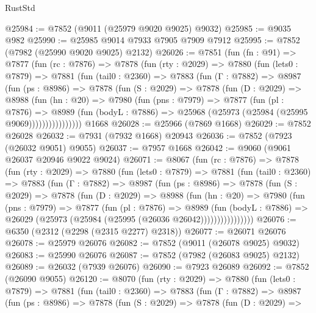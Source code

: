 \begin{lexlean}{RustStd}
\begin{coremodule}
@25984 := @7852 (@9011 (@25979 @9020 @9025) @9032)
@25985 := @9035 @982
@25990 := @25985 @9014 @7933 @7905 @7909 @7912
@25995 := @7852 (@7982 (@25990 @9020 @9025) @2132)
@26026 := @7851
    (fun (fn : @91) =>
    @7877
      (fun (rc : @7876) =>
      @7878
        (fun (rty : @2029) =>
        @7880
          (fun (lets0 : @7879) =>
          @7881
            (fun (tail0 : @2360) =>
            @7883
              (fun (Γ : @7882) =>
              @8987
                (fun (ps : @8986) =>
                @7878
                  (fun (S : @2029) =>
                  @7878
                    (fun (D : @2029) =>
                    @8988
                      (fun (hn : @20) =>
                      @7980
                        (fun (pns : @7979) =>
                        @7877
                          (fun (pl : @7876) =>
                          @8989
                            (fun (bodyL : @7886) =>
                            @25968 (@25973 (@25984 (@25995 @9069))))))))))))))))
    @1668
@26028 := @25966 (@7869 @1668)
@26029 := @7852 @26028
@26032 := @7931 (@7932 @1668) @20943
@26036 := @7852 (@7923 (@26032 @9051) @9055)
@26037 := @7957 @1668
@26042 := @9060 (@9061 @26037 @20946 @9022 @9024)
@26071 := @8067
    (fun (rc : @7876) =>
    @7878
      (fun (rty : @2029) =>
      @7880
        (fun (lets0 : @7879) =>
        @7881
          (fun (tail0 : @2360) =>
          @7883
            (fun (Γ : @7882) =>
            @8987
              (fun (ps : @8986) =>
              @7878
                (fun (S : @2029) =>
                @7878
                  (fun (D : @2029) =>
                  @8988
                    (fun (hn : @20) =>
                    @7980
                      (fun (pns : @7979) =>
                      @7877
                        (fun (pl : @7876) =>
                        @8989
                          (fun (bodyL : @7886) =>
                          @26029 (@25973 (@25984 (@25995 (@26036 @26042))))))))))))))))
@26076 := @6350 (@2312 (@2298 (@2315 @2277) @2318))
@26077 := @26071 @26076
@26078 := @25979 @26076
@26082 := @7852 (@9011 (@26078 @9025) @9032)
@26083 := @25990 @26076
@26087 := @7852 (@7982 (@26083 @9025) @2132)
@26089 := @26032 (@7939 @26076)
@26090 := @7923 @26089
@26092 := @7852 (@26090 @9055)
@26120 := @8070
    (fun (rty : @2029) =>
    @7880
      (fun (lets0 : @7879) =>
      @7881
        (fun (tail0 : @2360) =>
        @7883
          (fun (Γ : @7882) =>
          @8987
            (fun (ps : @8986) =>
            @7878
              (fun (S : @2029) =>
              @7878
                (fun (D : @2029) =>

\end{coremodule}
\end{lexlean}

